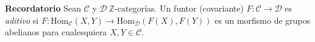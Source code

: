 \documentclass[preview]{standalone}
\begin{document}
\begin{center}
\flushleft \textbf{Recordatorio} Sean $\mathscr{C}$ y $\mathscr{D} \ \mathbb{Z}$-categorías. Un funtor (covariante) $F:\mathscr{C}\to\mathscr{D}$ es \emph{aditivo} si $F:\text{Hom}_\mathscr{C}(X,Y)\to \text{Hom}_\mathscr{D}(F(X), F(Y))$ es un morfismo de grupos abelianos para cualesquiera $X,Y\in\mathscr{C}$.
\end{center}
\end{document}
